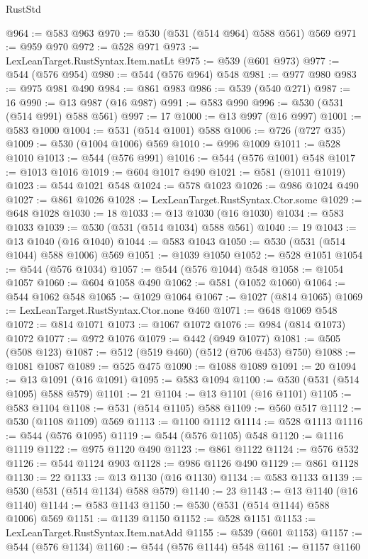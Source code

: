 \begin{lexlean}{RustStd}
\begin{coremodule}
@964 := @583 @963
@970 := @530 (@531 (@514 @964) @588 @561) @569
@971 := @959 @970
@972 := @528 @971
@973 := LexLeanTarget.RustSyntax.Item.natLt
@975 := @539 (@601 @973)
@977 := @544 (@576 @954)
@980 := @544 (@576 @964) @548
@981 := @977 @980
@983 := @975 @981 @490
@984 := @861 @983
@986 := @539 (@540 @271)
@987 := 16
@990 := @13 @987 (@16 @987)
@991 := @583 @990
@996 := @530 (@531 (@514 @991) @588 @561)
@997 := 17
@1000 := @13 @997 (@16 @997)
@1001 := @583 @1000
@1004 := @531 (@514 @1001) @588
@1006 := @726 (@727 @35)
@1009 := @530 (@1004 @1006) @569
@1010 := @996 @1009
@1011 := @528 @1010
@1013 := @544 (@576 @991)
@1016 := @544 (@576 @1001) @548
@1017 := @1013 @1016
@1019 := @604 @1017 @490
@1021 := @581 (@1011 @1019)
@1023 := @544 @1021 @548
@1024 := @578 @1023
@1026 := @986 @1024 @490
@1027 := @861 @1026
@1028 := LexLeanTarget.RustSyntax.Ctor.some
@1029 := @648 @1028
@1030 := 18
@1033 := @13 @1030 (@16 @1030)
@1034 := @583 @1033
@1039 := @530 (@531 (@514 @1034) @588 @561)
@1040 := 19
@1043 := @13 @1040 (@16 @1040)
@1044 := @583 @1043
@1050 := @530 (@531 (@514 @1044) @588 @1006) @569
@1051 := @1039 @1050
@1052 := @528 @1051
@1054 := @544 (@576 @1034)
@1057 := @544 (@576 @1044) @548
@1058 := @1054 @1057
@1060 := @604 @1058 @490
@1062 := @581 (@1052 @1060)
@1064 := @544 @1062 @548
@1065 := @1029 @1064
@1067 := @1027 (@814 @1065)
@1069 := LexLeanTarget.RustSyntax.Ctor.none @460
@1071 := @648 @1069 @548
@1072 := @814 @1071
@1073 := @1067 @1072
@1076 := @984 (@814 @1073) @1072
@1077 := @972 @1076
@1079 := @442 (@949 @1077)
@1081 := @505 (@508 @123)
@1087 := @512 (@519 @460) (@512 (@706 @453) @750)
@1088 := @1081 @1087
@1089 := @525 @475
@1090 := @1088 @1089
@1091 := 20
@1094 := @13 @1091 (@16 @1091)
@1095 := @583 @1094
@1100 := @530 (@531 (@514 @1095) @588 @579)
@1101 := 21
@1104 := @13 @1101 (@16 @1101)
@1105 := @583 @1104
@1108 := @531 (@514 @1105) @588
@1109 := @560 @517
@1112 := @530 (@1108 @1109) @569
@1113 := @1100 @1112
@1114 := @528 @1113
@1116 := @544 (@576 @1095)
@1119 := @544 (@576 @1105) @548
@1120 := @1116 @1119
@1122 := @975 @1120 @490
@1123 := @861 @1122
@1124 := @576 @532
@1126 := @544 @1124 @903
@1128 := @986 @1126 @490
@1129 := @861 @1128
@1130 := 22
@1133 := @13 @1130 (@16 @1130)
@1134 := @583 @1133
@1139 := @530 (@531 (@514 @1134) @588 @579)
@1140 := 23
@1143 := @13 @1140 (@16 @1140)
@1144 := @583 @1143
@1150 := @530 (@531 (@514 @1144) @588 @1006) @569
@1151 := @1139 @1150
@1152 := @528 @1151
@1153 := LexLeanTarget.RustSyntax.Item.natAdd
@1155 := @539 (@601 @1153)
@1157 := @544 (@576 @1134)
@1160 := @544 (@576 @1144) @548
@1161 := @1157 @1160

\end{coremodule}
\end{lexlean}
